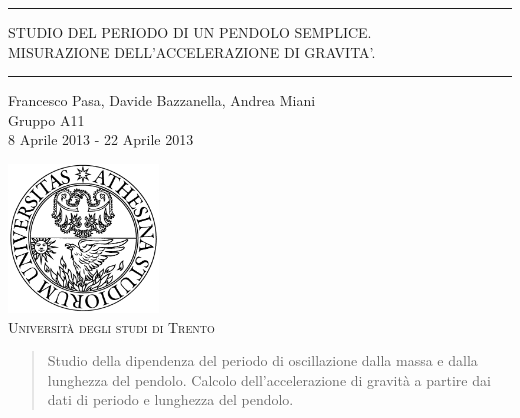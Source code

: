 \begin{titlepage}
\begin{center}

	\hrule \vspace{0.5cm}
     	\textsc{\LARGE STUDIO DEL PERIODO DI UN PENDOLO SEMPLICE.\\}
     	\vspace{0.4cm}
     	\textsc{\LARGE MISURAZIONE DELL'ACCELERAZIONE DI GRAVITA'.}
	\vspace{0.5cm} \hrule \vspace{2cm}

      	{\large Francesco Pasa, Davide Bazzanella, Andrea Miani\\
		Gruppo A11}\\
	\vspace{0.5cm}
      	{\large 8 Aprile 2013 - 22 Aprile 2013}
	\vfill

	\includegraphics[width=4cm]{unitn_logo.png}\\
	\vspace{1cm}
        \textsc{\Large Università degli studi di Trento}
	\vfill

	{\begin{abstract}
        Studio della dipendenza del periodo di oscillazione dalla massa e dalla lunghezza del pendolo.
        Calcolo dell'accelerazione di gravità a partire dai dati di periodo e lunghezza del pendolo.
	 \end{abstract}}
\end{center}
\end{titlepage}
